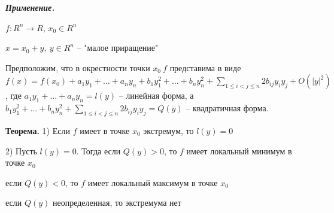 \vspace{\baselineskip}
\textbf{\textit{Применение.}}

$f : R^n \rightarrow R$, $x_0 \in R^n$

$x = x_0 + y, \ y \in R^n$ -- "малое приращение"

Предположим, что в окрестности точки $x_0 \ f$ представима в виде $f(x) = f(x_0) + a_1 y_1 + \dots + a_n y_n + b_1 y_1^2 + \dots + b_n y_n^2 + \sum\limits_{1 \leq i < j \leq n} 2 b_{ij} y_i y_j + O(|y|^2)$, где $a_1 y_1 + \dots + a_n y_n = l(y)$ -- линейная форма, а $b_1 y_1^2 + \dots + b_n y_n^2 + \sum\limits_{1 \leq i < j \leq n} 2 b_{ij} y_i y_j = Q(y)$ -- квадратичная форма.

\vspace{\baselineskip}
\textbf{Теорема.} 1) Если $f$ имеет в точке $x_0$ экстремум, то $l(y) = 0$

2) Пусть $l(y) = 0$. Тогда если $Q(y) > 0$, то $f$ имеет локальный минимум в точке $x_0$

если $Q(y) < 0$, то $f$ имеет локальный максимум в точке $x_0$

если $Q(y)$ неопределенная, то экстремума нет

